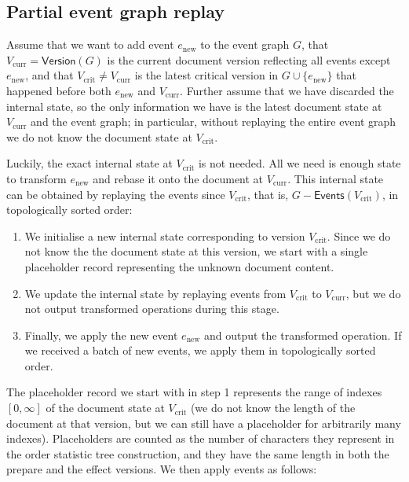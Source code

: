 \documentclass[sigplan,10pt]{acmart}
\begin{document}
\subsection{Partial event graph replay}\label{partial-replay}

Assume that we want to add event $e_\mathrm{new}$ to the event graph $G$, that $V_\mathrm{curr} = \mathsf{Version}(G)$ is the current document version reflecting all events except $e_\mathrm{new}$, and that $V_\mathrm{crit} \neq V_\mathrm{curr}$ is the latest critical version in $G \cup \{e_\mathrm{new}\}$ that happened before both $e_\mathrm{new}$ and $V_\mathrm{curr}$.
Further assume that we have discarded the internal state, so the only information we have is the latest document state at $V_\mathrm{curr}$ and the event graph; in particular, without replaying the entire event graph we do not know the document state at $V_\mathrm{crit}$.

Luckily, the exact internal state at $V_\mathrm{crit}$ is not needed. All we need is enough state to transform $e_\mathrm{new}$ and rebase it onto the document at $V_\mathrm{curr}$.
This internal state can be obtained by replaying the events since $V_\mathrm{crit}$, that is, $G - \mathsf{Events}(V_\mathrm{crit})$, in topologically sorted order:

\begin{enumerate}
\item We initialise a new internal state corresponding to version $V_\mathrm{crit}$. Since we do not know the the document state at this version, we start with a single placeholder record representing the unknown document content.
\item We update the internal state by replaying events from $V_\mathrm{crit}$ to $V_\mathrm{curr}$, but we do not output transformed operations during this stage.
\item Finally, we apply the new event $e_\mathrm{new}$ and output the transformed operation. If we received a batch of new events, we apply them in topologically sorted order.
\end{enumerate}

The placeholder record we start with in step 1 represents the range of indexes $[0, \infty]$ of the document state at $V_\mathrm{crit}$ (we do not know the length of the document at that version, but we can still have a placeholder for arbitrarily many indexes).
Placeholders are counted as the number of characters they represent in the order statistic tree construction, and they have the same length in both the prepare and the effect versions.
We then apply events as follows:
\end{document}
